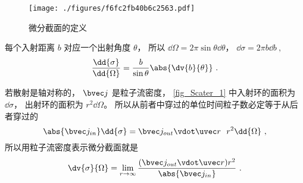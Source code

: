 
\begin{issues}
\issueDraft
\end{issues}



\begin{figure}[ht]
\centering
\texttt{[image: ./figures/f6fc2fb40b6c2563.pdf]}
\caption{微分截面的定义} \label{fig_Scater_1}
\end{figure}

每个入射距离 $b$ 对应一个出射角度 $\theta$， 所以 $\dd\Omega = 2\pi \sin\theta \dd{\theta}$， $\dd{\sigma} = 2\pi b \dd{b}~,$
\begin{equation}
\frac{\dd{\sigma}}{\dd{\Omega}} = \frac{b}{\sin\theta} \abs{\dv{b}{\theta}}~.
\end{equation}

若散射是轴对称的， $\bvec j$ 是粒子流密度， \autoref{fig_Scater_1} 中入射环的面积为 $\dd{\sigma}$， 出射环的面积为 $r^2\dd{\Omega}$。 所以从前者中穿过的单位时间粒子数必定等于从后者穿过的
\begin{equation}
\abs{\bvec j_{in}}\dd{\sigma} = \bvec j_{out} \vdot \uvec r\ \ r^2\dd{\Omega}~,
\end{equation}
所以用粒子流密度表示微分截面就是
\begin{equation}
\dv{\sigma}{\Omega} = \lim_{r\to\infty} \frac{(\bvec j_{out} \vdot \uvec r) r^2}{\abs{\bvec j_{in}}}~.
\end{equation}
